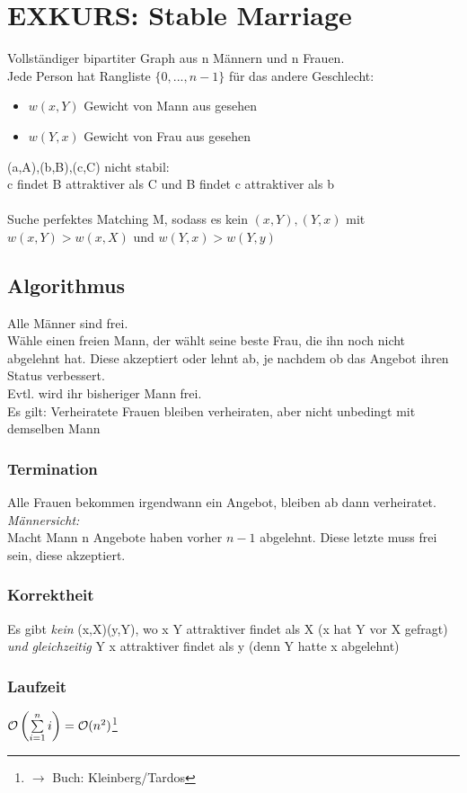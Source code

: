     \section{EXKURS: Stable Marriage}
		Vollständiger bipartiter Graph aus n Männern und n Frauen.\\
		Jede Person hat Rangliste $\{0,...,n-1\}$ für das andere Geschlecht:
		\begin{itemize}
			\item $w(x,Y)$ Gewicht von Mann aus gesehen
			\item $w(Y,x)$ Gewicht von Frau aus gesehen
		\end{itemize}
		(a,A),(b,B),(c,C) nicht stabil:\\
		c findet B attraktiver als C und B findet c attraktiver als b\\\\
		
		Suche perfektes Matching M, sodass es kein $(x,Y),(Y,x)$ mit $w(x,Y)>w(x,X)$ und $w(Y,x)>w(Y,y)$
		
		\subsection{Algorithmus}
			Alle Männer sind frei.\\
			Wähle einen freien Mann, der wählt seine beste Frau, die ihn noch nicht abgelehnt hat. Diese akzeptiert oder lehnt ab, je nachdem ob das Angebot ihren Status verbessert.\\
			Evtl. wird ihr bisheriger Mann frei.\\
			Es gilt: Verheiratete Frauen bleiben verheiraten, aber nicht unbedingt mit demselben Mann
			\subsubsection{Termination}
				Alle Frauen bekommen irgendwann ein Angebot, bleiben ab dann verheiratet.\\
				\emph{Männersicht:}\\
					Macht Mann n Angebote haben vorher $n-1$ abgelehnt. Diese letzte muss frei sein, diese akzeptiert.
			\subsubsection{Korrektheit}
				Es gibt \emph{kein} (x,X)(y,Y), wo x Y attraktiver findet als X (x hat Y vor X gefragt) \emph{und gleichzeitig} Y x attraktiver findet als y (denn Y hatte x abgelehnt)
			\subsubsection{Laufzeit}
				$\mathcal{O}\left(\sum\limits_{i=1}^n i\right)=\mathcal{O}(n^2)$\footnote{$\rightarrow$ Buch: Kleinberg/Tardos}
